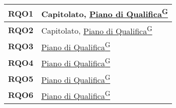 \begin{longtable}{|>{\centering\arraybackslash}m{}|>{\centering\arraybackslash}m{}|}
	\textbf{RQO1}            & Capitolato, \href{https://code7crusaders.github.io/docs/RTB/documentazione_interna/glossario.html#piano-di-qualifica}{Piano di Qualifica\textsuperscript{G}}\\\hline
	\textbf{RQO2}            & Capitolato, \href{https://code7crusaders.github.io/docs/RTB/documentazione_interna/glossario.html#piano-di-qualifica}{Piano di Qualifica\textsuperscript{G}}\\\hline
	\textbf{RQO3}            & \href{https://code7crusaders.github.io/docs/RTB/documentazione_interna/glossario.html#piano-di-qualifica}{Piano di Qualifica\textsuperscript{G}}\\\hline
    \textbf{RQO4}            & \href{https://code7crusaders.github.io/docs/RTB/documentazione_interna/glossario.html#piano-di-qualifica}{Piano di Qualifica\textsuperscript{G}}\\\hline
	\textbf{RQO5}            & \href{https://code7crusaders.github.io/docs/RTB/documentazione_interna/glossario.html#piano-di-qualifica}{Piano di Qualifica\textsuperscript{G}}\\\hline
	\textbf{RQO6}            & \href{https://code7crusaders.github.io/docs/RTB/documentazione_interna/glossario.html#piano-di-qualifica}{Piano di Qualifica\textsuperscript{G}}\\\hline


\end{longtable}

